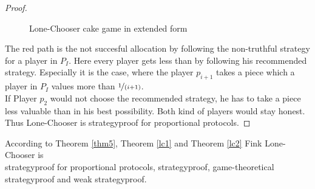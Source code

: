 \begin{proof}
\begin{figure}[h!]
\begin{center}
	\caption{Lone-Chooser cake game in extended form}
\end{center}
\end{figure}
\newline
The red path is the not succesful allocation by following the non-truthful strategy for a player in $P_I$. Here every player gets less than by following his recommended strategy. Especially it is the case, where the player $p_{i+1}$ takes a piece which a player in $P_I$ values more than $\nicefrac{1}{(i+1)}$.\\If Player $p_2$ would not choose the recommended strategy, he has to take a piece less valuable than in his best possibility. Both kind of players would stay honest. Thus Lone-Chooser is strategyproof for proportional protocols.
\end{proof}
\begin{bezeichnungen}
According to Theorem \ref{thm5}, Theorem \ref{lc1} and Theorem \ref{lc2} Fink Lone-Chooser is\\strategyproof for proportional protocols, strategyproof, game-theoretical strategyproof and weak strategyproof.
\end{bezeichnungen}
\newpage
